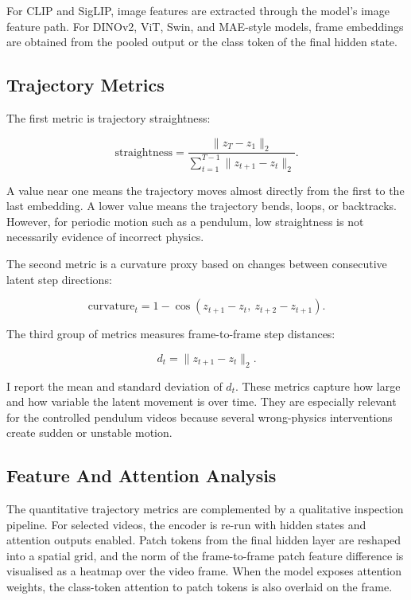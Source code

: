 \documentclass[final-report]{report-template}
\begin{document}
For CLIP and SigLIP, image features are extracted through the model's image
feature path. For DINOv2, ViT, Swin, and MAE-style models, frame embeddings are
obtained from the pooled output or the class token of the final hidden state.

\subsection{Trajectory Metrics}
The first metric is trajectory straightness:

\begin{equation}
    \mathrm{straightness}
    =
    \frac{\lVert z_T - z_1 \rVert_2}
    {\sum_{t=1}^{T-1} \lVert z_{t+1} - z_t \rVert_2}.
\end{equation}

A value near one means the trajectory moves almost directly from the first to
the last embedding. A lower value means the trajectory bends, loops, or
backtracks. However, for periodic motion such as a pendulum, low straightness is
not necessarily evidence of incorrect physics.

The second metric is a curvature proxy based on changes between consecutive
latent step directions:

\begin{equation}
    \mathrm{curvature}_t
    =
    1 -
    \cos \left(z_{t+1} - z_t,\ z_{t+2} - z_{t+1}\right).
\end{equation}

The third group of metrics measures frame-to-frame step distances:

\begin{equation}
    d_t = \lVert z_{t+1} - z_t \rVert_2.
\end{equation}

I report the mean and standard deviation of $d_t$. These metrics capture how
large and how variable the latent movement is over time. They are especially
relevant for the controlled pendulum videos because several wrong-physics
interventions create sudden or unstable motion.

\subsection{Feature And Attention Analysis}
The quantitative trajectory metrics are complemented by a qualitative
inspection pipeline. For selected videos, the encoder is re-run with hidden
states and attention outputs enabled. Patch tokens from the final hidden layer
are reshaped into a spatial grid, and the norm of the frame-to-frame patch
feature difference is visualised as a heatmap over the video frame. When the
model exposes attention weights, the class-token attention to patch tokens is
also overlaid on the frame.
\end{document}
